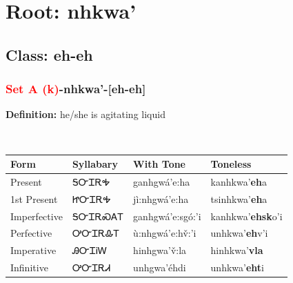 \needspace{4in}
\section*{Root: nhkwa'}
\nopagebreak
{}
\needspace{3in}
\subsection*{Class: eh-eh}
\nopagebreak
\needspace{2in}
\subsubsection*{\textcolor{Red}{Set A (k)}{-}\textbf{nhkwa'}{-}[eh-eh]}
\nopagebreak
\textbf{Definition: } he/she is agitating liquid
\\[0.5em]
\begin{tabularx}{\textwidth}{l X X X}%
\toprule%
\textbf{Form}&\textbf{Syllabary}&\textbf{With Tone}&\textbf{Toneless}\\%
\midrule%
Present&ᎦᏅᏆᎡᎭ&ganhgwá’e:ha&kanhkwa'\textbf{eh}a\\%
1st Present&ᏥᏅᏆᎡᎭ&jì:nhgwá’e:ha&tsinhkwa'\textbf{eh}a\\%
Imperfective&ᎦᏅᏆᎡᏍᎪᎢ&ganhgwá’e:sgó:’i&kanhkwa'\textbf{ehsk}o'i\\%
Perfective&ᎤᏅᏆᎡᎲᎢ&ù:nhgwá’e:hv̌:’i&unhkwa'\textbf{eh}v'i\\%
Imperative&ᎯᏅᏆᎥᎳ&hinhgwa’v̌:la&hinhkwa'\textbf{vla}\\%
Infinitive&ᎤᏅᏆᎡᏗ&unhgwa’éhdi&unhkwa'\textbf{eht}i\\%
\bottomrule%
\end{tabularx}
\\[1em]